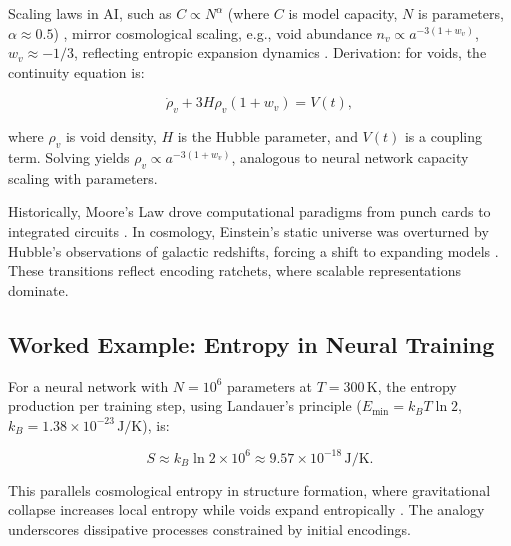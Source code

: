 \documentclass[12pt]{book}
\begin{document}
Scaling laws in AI, such as \( C \propto N^\alpha \) (where \( C \) is model capacity, \( N \) is parameters, \( \alpha \approx 0.5 \)) \citep{Kaplan2020}, mirror cosmological scaling, e.g., void abundance \( n_v \propto a^{-3(1+w_v)} \), \( w_v \approx -1/3 \), reflecting entropic expansion dynamics \citep{Giani2025}. Derivation: for voids, the continuity equation is:

\[ \dot{\rho}_v + 3H\rho_v(1 + w_v) = V(t), \]

where \( \rho_v \) is void density, \( H \) is the Hubble parameter, and \( V(t) \) is a coupling term. Solving yields \( \rho_v \propto a^{-3(1+w_v)} \), analogous to neural network capacity scaling with parameters.

Historically, Moore’s Law drove computational paradigms from punch cards to integrated circuits \citep{Ceruzzi2003}. In cosmology, Einstein’s static universe was overturned by Hubble’s observations of galactic redshifts, forcing a shift to expanding models \citep{Hubble1929}. These transitions reflect encoding ratchets, where scalable representations dominate.

\subsection{Worked Example: Entropy in Neural Training}
For a neural network with \( N = 10^6 \) parameters at \( T = 300 \, \text{K} \), the entropy production per training step, using Landauer’s principle (\( E_{\min} = k_B T \ln 2 \), \( k_B = 1.38 \times 10^{-23} \, \text{J/K} \)), is:

\[ S \approx k_B \ln 2 \times 10^6 \approx 9.57 \times 10^{-18} \, \text{J/K}. \]

This parallels cosmological entropy in structure formation, where gravitational collapse increases local entropy while voids expand entropically \citep{Weinberg1971}. The analogy underscores dissipative processes constrained by initial encodings.
\end{document}
